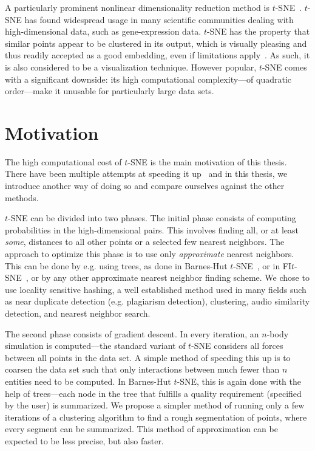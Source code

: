 A particularly prominent nonlinear dimensionality reduction method is
$t$-SNE~\cite{tsne}.  $t$-SNE has found widespread usage in many scientific
communities dealing with high-dimensional data, such as gene-expression data.
$t$-SNE has the property that similar points appear to be clustered in its
output, which is visually pleasing and thus readily accepted as a good
embedding, even if limitations apply~\cite{art_tsne,misread_tsne}. As such, it
is also considered to be a visualization technique. However popular, $t$-SNE
comes with a significant downside: its high computational complexity---of
quadratic order---make it unusable for particularly large data sets.

\section{Motivation}

The high computational cost of $t$-SNE is the main motivation of this thesis.
There have been multiple attempts at speeding it up~\cite{bhtsne,fitsne,umap,largevis}
and in this thesis, we introduce another way of doing so and compare ourselves
against the other methods.

$t$-SNE can be divided into two phases. The initial phase consists of computing
probabilities in the high-dimensional pairs. This involves finding all, or at
least \emph{some}, distances to all other points or a selected few nearest
neighbors. The approach to optimize this phase is to use only \emph{approximate}
nearest neighbors. This can be done by e.g. using trees, as done in Barnes-Hut
$t$-SNE~\cite{bhtsne}, or in FI$t$-SNE~\cite{fitsne}, or by any other approximate
nearest neighbor finding scheme. We chose to use locality sensitive hashing, a
well established method used in many fields such as near duplicate detection (e.g.
plagiarism detection), clustering, audio similarity detection, and nearest
neighbor search.

The second phase consists of gradient descent. In every iteration, an $n$-body
simulation is computed---the standard variant of $t$-SNE considers all forces
between all points in the data set. A simple method of speeding this up is to
coarsen the data set such that only interactions between much fewer than $n$
entities need to be computed. In Barnes-Hut $t$-SNE, this is again done with
the help of trees---each node in the tree that fulfills a quality requirement
(specified by the user) is summarized. We propose a simpler method of running
only a few iterations of a clustering algorithm to find a rough segmentation of
points, where every segment can be summarized. This method of approximation can
be expected to be less precise, but also faster.

